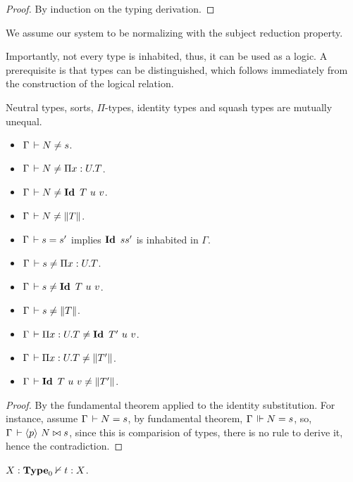 \documentclass[a4paper,english]{lipics-utf8x}
\begin{document}
  \begin{proof}
    By induction on the typing derivation.
  \end{proof}


  We assume our system to be normalizing with the subject reduction property.


  Importantly, not every type is inhabited, thus, it can be used as a logic.
  A prerequisite is that types can be distinguished, which follows immediately
  from the construction of the logical relation.

  \begin{lemma}
    \label{lem:cons-discr}
    Neutral types, sorts, $\Pi$-types, identity types and
    squash types are mutually unequal.
    \leavevmode
    \begin{itemize}
      \item $\Gamma \,\vdash N \neq s$.
      \item $\Gamma \,\vdash N \neq \Pi x:U.T$.
      \item $\Gamma \der N \neq \Id T\ u\ v$.
      \item $\Gamma \,\vdash N \neq \|T\|$.
      \item $\Gamma \,\vdash s = s'$ implies $\operatorname{\mathbf{Id}~} s s'$ is inhabited in $\Gamma$.
      \item $\Gamma \,\vdash s \neq \Pi x:U.T$.
      \item $\Gamma \der s \neq \Id T\ u\ v$.
      \item $\Gamma \,\vdash s \neq \|T\|$.
      \item $\Gamma \der \Pi x:U.T \neq \Id T'\ u\ v$.
      \item $\Gamma \,\vdash \Pi x:U.T \neq \|T'\|$.
      \item $\Gamma \,\vdash \operatorname{\mathbf{Id}~} T\ u\ v \neq \|T'\|$.
    \end{itemize}
  \end{lemma}

  \begin{proof}
    By the fundamental theorem applied to the identity substitution.
    For instance, assume $\Gamma \,\vdash N = s$, by fundamental theorem,
    $\Gamma \,\Vdash N = s$, so, $\Gamma \,\vdash \langle p \rangle~ N \mathrel{\bowtie} s$, since this is
    comparision of types, there is no rule to derive it, hence the
    contradiction.
  \end{proof}

  \begin{theorem}[Consistency]
    $X : \operatorname{\mathbf{Type}}_0 \nvdash t : X$.
  \end{theorem}
\end{document}
